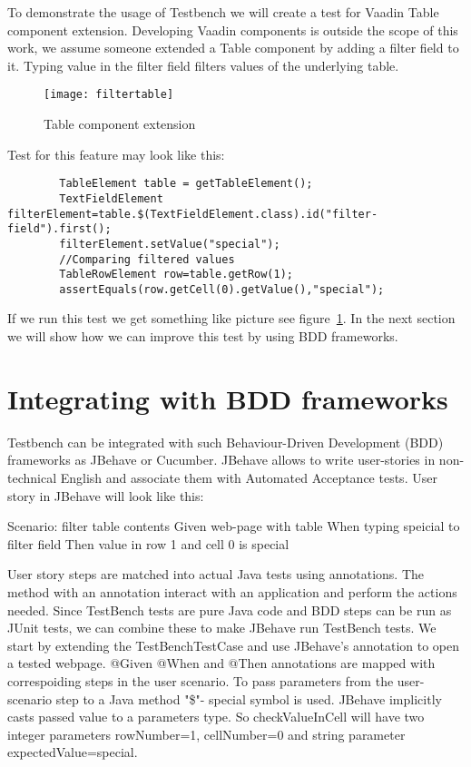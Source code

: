 To demonstrate the usage of Testbench we will create a test for Vaadin Table
component extension. Developing Vaadin components is outside the scope of this
work, we assume someone extended a Table component by adding a filter field to
it. Typing value in the filter field filters values of the underlying table. 
	\begin{figure}
	\label{fig:filtertable}
	\texttt{[image: filtertable]}
	\caption{Table component extension}
	\end{figure}

Test for this feature may look like this:
  	\lstset{language=Java}
  	\begin{lstlisting}
		TableElement table = getTableElement();
		TextFieldElement filterElement=table.$(TextFieldElement.class).id("filter-field").first();
		filterElement.setValue("special");
		//Comparing filtered values
		TableRowElement row=table.getRow(1);
		assertEquals(row.getCell(0).getValue(),"special");
	\end{lstlisting}	
	
If we run this test we get something like picture see
figure~\ref{fig:filtertable}. In the next section we will show how we can improve this test by using BDD frameworks.

\section{Integrating with BDD frameworks}

Testbench can be integrated with such Behaviour-Driven Development (BDD)
frameworks as JBehave or Cucumber.
JBehave allows to write user-stories in non-technical English and associate them with Automated Acceptance tests. 
User story in JBehave will look like this:

Scenario: filter table contents
Given web-page with table
When typing speicial to filter field
Then value in row 1 and cell 0 is special

User story steps are matched into actual Java tests using annotations. 
 The method with an annotation interact with an application and perform the actions needed.
  Since TestBench tests are pure Java code and BDD steps can be run as JUnit tests, we can combine these to make
   JBehave run TestBench tests. We start by extending the TestBenchTestCase  and use JBehave's \@BeforeScenario
   annotation to open a tested webpage.
   @Given @When and @Then annotations are mapped with correspoiding steps in the user scenario.
   To pass parameters from the user-scenario step to a Java method "\$"- special symbol is used.
    JBehave implicitly casts passed value to a parameters type.
    So checkValueInCell will have two integer parameters rowNumber=1, cellNumber=0 and string parameter expectedValue=special. 


